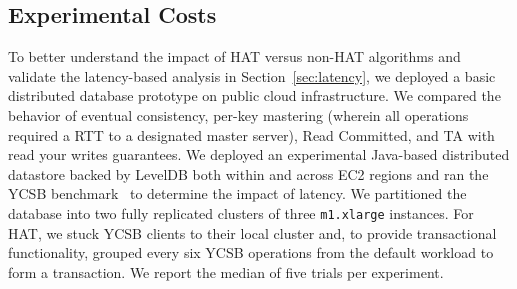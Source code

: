 \subsection{Experimental Costs}

To better understand the impact of HAT versus non-HAT algorithms and
validate the latency-based analysis in Section~\ref{sec:latency}, we
deployed a basic distributed database prototype on public cloud
infrastructure. We compared the behavior of eventual consistency,
per-key mastering (wherein all operations required a RTT to a
designated master server), Read Committed, and TA with read your
writes guarantees. We deployed an experimental Java-based distributed
datastore backed by LevelDB both within and across EC2 regions and ran
the YCSB benchmark~\cite{ycsb} to determine the impact of latency. We
partitioned the database into two fully replicated clusters of three
\texttt{m1.xlarge} instances. For HAT, we stuck YCSB clients to their
local cluster and, to provide transactional functionality, grouped
every six YCSB operations from the default workload to form a
transaction. We report the median of five trials per experiment.

